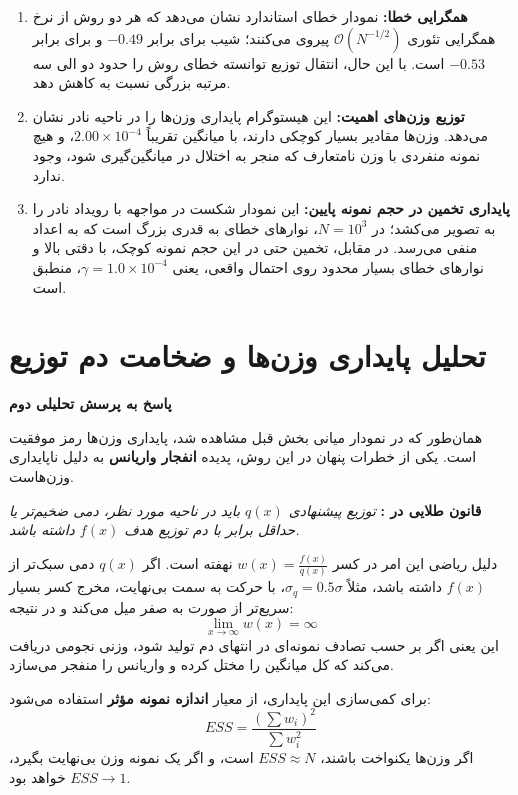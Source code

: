 \documentclass[12pt,a4paper]{article}
\begin{document}
	\begin{enumerate}
		\item \textbf{همگرایی خطا:} نمودار  خطای استاندارد نشان می‌دهد که هر دو روش از نرخ همگرایی تئوری $\mathcal{O}(N^{-1/2})$ پیروی می‌کنند؛ شیب برای  برابر $-0.49$ و برای  برابر $-0.53$ است. با این حال، انتقال توزیع توانسته خطای روش  را حدود دو الی سه مرتبه بزرگی  نسبت به  کاهش دهد.
		\item \textbf{توزیع وزن‌های اهمیت:} این هیستوگرام پایداری وزن‌ها را در ناحیه نادر نشان می‌دهد. وزن‌ها مقادیر بسیار کوچکی دارند، با میانگین تقریباً $2.00 \times 10^{-4}$، و هیچ نمونه منفردی با وزن نامتعارف که منجر به اختلال در میانگین‌گیری شود، وجود ندارد.
		\item \textbf{پایداری تخمین در حجم نمونه پایین:} این نمودار شکست  در مواجهه با رویداد نادر را به تصویر می‌کشد؛ در $N=10^3$، نوارهای خطای  به قدری بزرگ است که به اعداد منفی می‌رسد. در مقابل، تخمین  حتی در این حجم نمونه کوچک، با دقتی بالا و نوارهای خطای بسیار محدود روی احتمال واقعی، یعنی $\gamma = 1.0 \times 10^{-4}$، منطبق است.
	\end{enumerate}
	
	\section{تحلیل پایداری وزن‌ها و ضخامت دم توزیع}
	
	\textbf{پاسخ به پرسش تحلیلی دوم}\label{sec:q2}
	
	همان‌طور که در نمودار میانی بخش قبل مشاهده شد، پایداری وزن‌ها رمز موفقیت  است. یکی از خطرات پنهان در این روش، پدیده \textbf{انفجار واریانس } به دلیل ناپایداری وزن‌هاست.
	
	\textbf{قانون طلایی در :}
	\textit{توزیع پیشنهادی $q(x)$ باید در ناحیه مورد نظر، دمی ضخیم‌تر  یا حداقل برابر با دم توزیع هدف $f(x)$ داشته باشد.}
	
	دلیل ریاضی این امر در کسر $w(x) = \frac{f(x)}{q(x)}$ نهفته است. اگر $q(x)$ دمی سبک‌تر از $f(x)$ داشته باشد، مثلاً $\sigma_q = 0.5\sigma$، با حرکت به سمت بی‌نهایت، مخرج کسر بسیار سریع‌تر از صورت به صفر میل می‌کند و در نتیجه:
	\[
	\lim_{x \to \infty} w(x) = \infty
	\]
	این یعنی اگر بر حسب تصادف نمونه‌ای در انتهای دم تولید شود، وزنی نجومی دریافت می‌کند که کل میانگین را مختل کرده و واریانس را منفجر می‌سازد.
	
	برای کمی‌سازی این پایداری، از معیار \textbf{اندازه نمونه مؤثر } استفاده می‌شود:
	\[
	ESS =
	\frac{\left(\sum w_i\right)^2}{\sum w_i^2}
	\]
	اگر وزن‌ها یکنواخت باشند، $ESS \approx N$ است، و اگر یک نمونه وزن بی‌نهایت بگیرد، $ESS \to 1$ خواهد بود.
	
\end{document}
